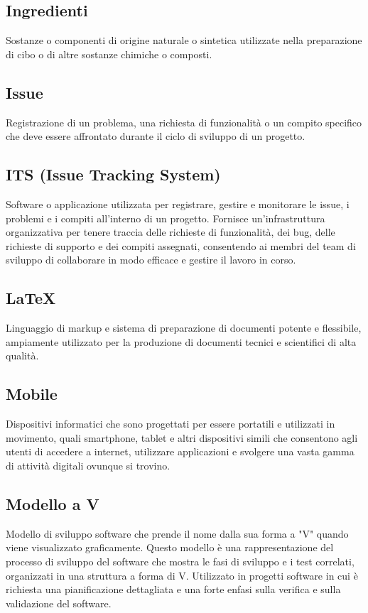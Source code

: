 \subsection{Ingredienti}Sostanze o componenti di origine naturale o sintetica utilizzate nella preparazione di cibo o di altre sostanze chimiche o composti.
\subsection{Issue}Registrazione di un problema, una richiesta di funzionalità o un compito specifico che deve essere affrontato durante il ciclo di sviluppo di un progetto.
\subsection{ITS (Issue Tracking System)}Software o applicazione utilizzata per registrare, gestire e monitorare le issue, i problemi e i compiti all'interno di un progetto. Fornisce un'infrastruttura organizzativa per tenere traccia delle richieste di funzionalità, dei bug, delle richieste di supporto e dei compiti assegnati, consentendo ai membri del team di sviluppo di collaborare in modo efficace e gestire il lavoro in corso.
\subsection{LaTeX}Linguaggio di markup e sistema di preparazione di documenti potente e flessibile, ampiamente utilizzato per la produzione di documenti tecnici e scientifici di alta qualità.
\subsection{Mobile}Dispositivi informatici che sono progettati per essere portatili e utilizzati in movimento, quali smartphone, tablet e altri dispositivi simili che consentono agli utenti di accedere a internet, utilizzare applicazioni e svolgere una vasta gamma di attività digitali ovunque si trovino.
\subsection{Modello a V}Modello di sviluppo software che prende il nome dalla sua forma a "V" quando viene visualizzato graficamente. Questo modello è una rappresentazione del processo di sviluppo del software che mostra le fasi di sviluppo e i test correlati, organizzati in una struttura a forma di V. Utilizzato in progetti software in cui è richiesta una pianificazione dettagliata e una forte enfasi sulla verifica e sulla validazione del software.
